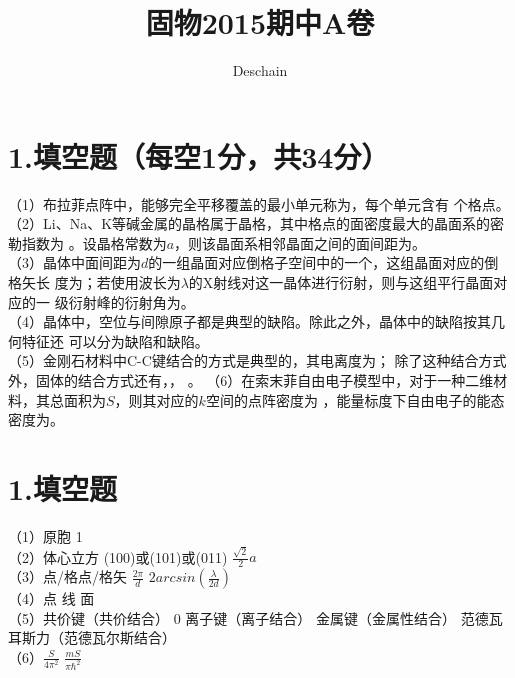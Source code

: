 \documentclass[UTF8]{ctexart}
\title{固物2015期中A卷}
\author{Deschain}
\begin{document}
\maketitle
\section*{\bfseries 1.填空题（每空1分，共34分）}
（1）布拉菲点阵中，能够完全平移覆盖的最小单元称为\underline{\makebox[3em]{}}，每个单元含有
\underline{\makebox[2em]{}}个格点。\\
（2）Li、Na、K等碱金属的晶格属于\underline{\makebox[6em]{}}晶格，其中格点的面密度最大的晶面系的密勒指数为
\underline{\makebox[4em]{}}。设晶格常数为$a$，则该晶面系相邻晶面之间的面间距为\underline{\makebox[4em]{}}。\\
（3）晶体中面间距为$d$的一组晶面对应倒格子空间中的一个\underline{\makebox[3em]{}}，这组晶面对应的倒格矢长
度为\underline{\makebox[3em]{}}；若使用波长为$\lambda$的X射线对这一晶体进行衍射，则与这组平行晶面对应的一
级衍射峰的衍射角为\underline{\makebox[9em]{}}。\\
（4）晶体中，空位与间隙原子都是典型的\underline{\makebox[2em]{}}缺陷。除此之外，晶体中的缺陷按其几何特征还
可以分为\underline{\makebox[2em]{}}缺陷和\underline{\makebox[2em]{}}缺陷。\\
（5）金刚石材料中C-C键结合的方式是典型的\underline{\makebox[6em]{}}，其电离度为\underline{\makebox[2em]{}}；
除了这种结合方式外，固体的结合方式还有\underline{\makebox[6em]{}}，\underline{\makebox[6em]{}}，
\underline{\makebox[9em]{}}。
（6）在索末菲自由电子模型中，对于一种二维材料，其总面积为$S$，则其对应的$k$空间的点阵密度为
\underline{\makebox[4em]{}}，能量标度下自由电子的能态密度为\underline{\makebox[4em]{}}。\\













\newpage
\section*{\bfseries 1.填空题}
（1）原胞\makebox[2em]{}
1\\
（2）体心立方\makebox[2em]{}
(100)或(101)或(011)\makebox[2em]{}
$\frac{\sqrt2}{2}a$\\
（3）点/格点/格矢\makebox[2em]{}
$\frac{2\pi}{d}$\makebox[2em]{}
$2arcsin(\frac{\lambda}{2d})$\\
（4）点\makebox[2em]{}
线\makebox[2em]{}
面\\
（5）共价键（共价结合）\makebox[2em]{}
0\makebox[2em]{}
离子键（离子结合）\makebox[2em]{}
金属键（金属性结合）\makebox[2em]{}
范德瓦耳斯力（范德瓦尔斯结合）\\
（6）$\frac{S}{4\pi^2}$\makebox[2em]{}
$\frac{mS}{\pi\hbar^2}$\\
\end{document}
